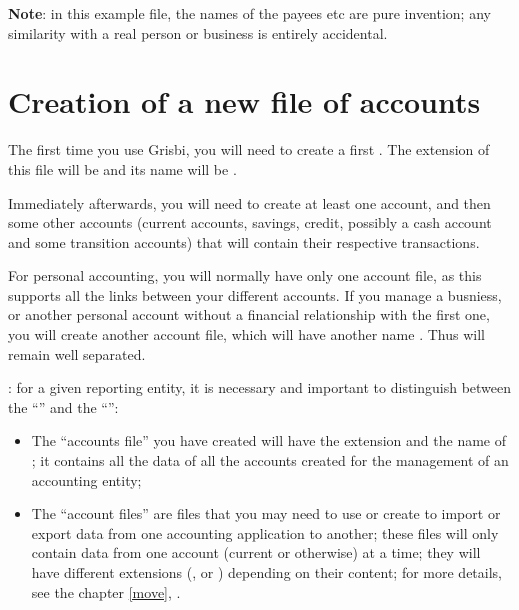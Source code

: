 \textbf{Note}: in this example file, the names of the payees etc are pure invention; any similarity with a real person or business is entirely accidental.

\section{Creation of a new file of accounts\label{start-newfile}}


The first time you use Grisbi, you will need to create a first
. The \gls{extension} of this file will be  and its name will be .


Immediately afterwards, you will need to create at least one account, and then some other accounts (current accounts, savings, credit, possibly a cash account and some transition accounts) that will contain their respective transactions.

For personal accounting, you will normally have only one account file, as this supports all the links between your different accounts. If you manage a busniess, or another personal account without a financial relationship with the first one, you will create another account file, which will have another name . Thus  will remain well separated.



: for a given reporting entity, it is necessary and important to distinguish between the  \enquote{} and the  \enquote{}:
\begin{itemize}

\item The \enquote{accounts file} you have created will have the extension  and the name of ; it contains all the data of all the accounts created for the management of an accounting entity;

\item The \enquote{account files} are files that you may need to use or create to import or export data from one accounting application to another; these files will only contain data from one account (current or otherwise) at a time; they will have different extensions (,  or ) depending on their content; for more details, see the chapter \vref{move}, .
\end{itemize}

